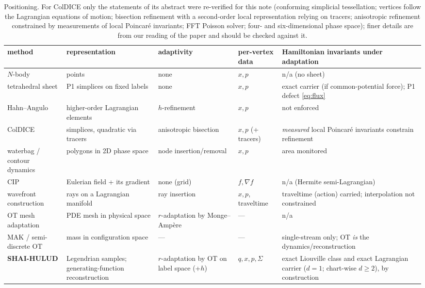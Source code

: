 \begin{table}[t]\centering\footnotesize
\begin{tabular}{p{2.8cm}p{3.0cm}p{2.5cm}p{2.2cm}p{3.5cm}}\toprule
method & representation & adaptivity & per-vertex data & Hamiltonian invariants under adaptation\\\midrule
$N$-body & points & none & $x,p$ & n/a (no sheet)\\
tetrahedral sheet \cite{AbelHahnKaehler2012,ShandarinHabibHeitmann2012,HahnAbelKaehler2013} & P1 simplices on fixed labels & none & $x,p$ & exact carrier (if common-potential force); P1 defect \eqref{eq:flux}\\
Hahn--Angulo \cite{HahnAngulo2016} & higher-order Lagrangian elements & $h$-refinement & $x,p$ & not enforced\\
ColDICE \cite{SousbieColombi2016} & simplices, quadratic via tracers & anisotropic bisection & $x,p$ (+ tracers) & \emph{measured} local Poincar\'e invariants constrain refinement\\
waterbag / contour dynamics \cite{ColombiTouma2014,Dritschel1988} & polygons in 2D phase space & node insertion/removal & $x,p$ & area monitored\\
CIP \cite{YabeAoki1991} & Eulerian field + its gradient & none (grid) & $f,\nabla f$ & n/a (Hermite semi-Lagrangian)\\
wavefront construction \cite{VinjeEtAl1993,EngquistRunborg2003} & rays on a Lagrangian manifold & ray insertion & $x,p$, traveltime & traveltime (action) carried; interpolation not constrained\\
OT mesh adaptation \cite{BuddWilliams2006,Delzanno2008,Weller2016} & PDE mesh in physical space & $r$-adaptation by Monge--Amp\`ere & --- & n/a\\
MAK / semi-discrete OT \cite{FrischEtAl2002,BrenierEtAl2003,LevyEtAl2021} & mass in configuration space & --- & --- & single-stream only; OT \emph{is} the dynamics/reconstruction\\\midrule
\textbf{SHAI-HULUD} & Legendrian samples; generating-function reconstruction & $r$-adaptation by OT on label space (+$h$) & $q,x,p,\Sigma$ & exact Liouville class and exact Lagrangian carrier ($d=1$; chart-wise $d\ge2$), by construction\\\bottomrule
\end{tabular}
\caption{Positioning. For ColDICE only the statements of its abstract were re-verified for this note (conforming
simplicial tessellation; vertices follow the Lagrangian equations of motion; bisection refinement with a
second-order local representation relying on tracers; anisotropic refinement constrained by measurements of local
Poincar\'e invariants; FFT Poisson solver; four- and six-dimensional phase space); finer details are from our
reading of the paper and should be checked against it.}\label{tab:prior}
\end{table}

